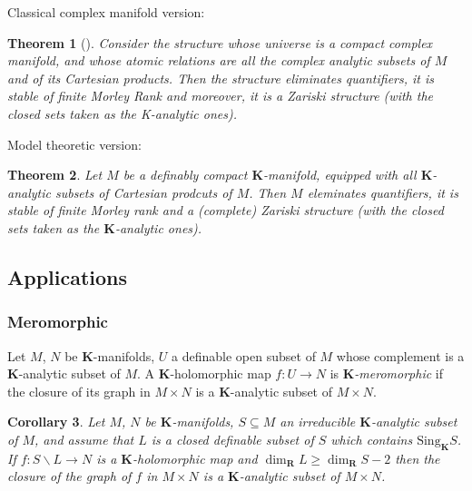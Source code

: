 \documentclass{amsart}
\newtheorem{theorem}{Theorem}[subsection]
\newtheorem{corollary}[theorem]{Corollary}
\theoremstyle{definition}
\numberwithin{equation}{section}
\begin{document}
Classical complex manifold version:
\begin{theorem}[{\cite{zbMATH00554994}}]
  Consider the structure whose universe is a compact complex manifold,
  and whose atomic relations are all the complex analytic subsets of $M$ and of its Cartesian products.
  Then the structure eliminates quantifiers,
  it is stable of finite Morley Rank and moreover,
  it is a Zariski structure
  (with the closed sets taken as the K-analytic ones).
\end{theorem}

Model theoretic version:
\begin{theorem}
  Let $M$ be a definably compact $\mathbf{K}$-manifold,
  equipped with all $\mathbf{K}$-analytic subsets of Cartesian prodcuts of $M$.
  Then $M$ eleminates quantifiers,
  it is stable of finite Morley rank and a (complete) Zariski structure
  (with the closed sets taken as the $\mathbf{K}$-analytic ones).
\end{theorem}

\subsection{Applications}
\subsubsection{Meromorphic}
Let $M$, $N$ be $\mathbf{K}$-manifolds,
$U$ a definable open subset of $M$
whose complement is a $\mathbf{K}$-analytic subset of $M$.
A $\mathbf{K}$-holomorphic map $f: U \to N$ is
\emph{$\mathbf{K}$-meromorphic} if the closure of its graph in $M \times N$
is a $\mathbf{K}$-analytic subset of $M \times N$.

\begin{corollary}
  Let $M$, $N$ be $\mathbf{K}$-manifolds,
  $S \subseteq M$ an irreducible $\mathbf{K}$-analytic subset of $M$,
  and assume that $L$ is a closed definable subset of $S$ which contains $\mathrm{Sing}_{\mathbf{K}}S$.
  If $f: S \backslash L \to N$ is a $\mathbf{K}$-holomorphic map and
  $\dim_{\mathbf{R}}L \ge \dim_{\mathbf{R}}S -2$ then
  the closure of the graph of $f$ in $M \times N$ is a $\mathbf{K}$-analytic subset of $M \times N$.
\end{corollary}
\end{document}

